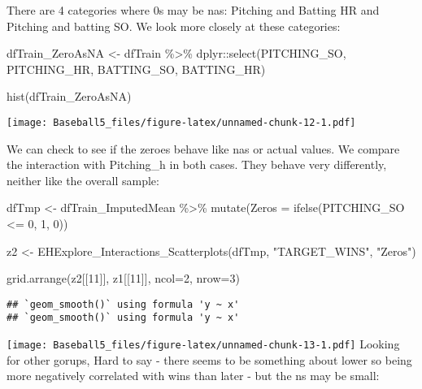 \documentclass[
]{article}
\newenvironment{Shaded}{\begin{snugshade}}{\end{snugshade}}
\newcommand{\AttributeTok}[1]{\textcolor[rgb]{0.77,0.63,0.00}{#1}}
\newcommand{\DecValTok}[1]{\textcolor[rgb]{0.00,0.00,0.81}{#1}}
\newcommand{\FunctionTok}[1]{\textcolor[rgb]{0.00,0.00,0.00}{#1}}
\newcommand{\NormalTok}[1]{#1}
\newcommand{\OtherTok}[1]{\textcolor[rgb]{0.56,0.35,0.01}{#1}}
\newcommand{\SpecialCharTok}[1]{\textcolor[rgb]{0.00,0.00,0.00}{#1}}
\newcommand{\StringTok}[1]{\textcolor[rgb]{0.31,0.60,0.02}{#1}}
\begin{document}
There are 4 categories where 0s may be nas: Pitching and Batting HR and
Pitching and batting SO. We look more closely at these categories:

\begin{Shaded}
\begin{Highlighting}[]
\NormalTok{dfTrain\_ZeroAsNA }\OtherTok{\textless{}{-}}\NormalTok{ dfTrain }\SpecialCharTok{\%\textgreater{}\%}
\NormalTok{dplyr}\SpecialCharTok{::}\FunctionTok{select}\NormalTok{(PITCHING\_SO, PITCHING\_HR, BATTING\_SO, BATTING\_HR)}

\FunctionTok{hist}\NormalTok{(dfTrain\_ZeroAsNA)}
\end{Highlighting}
\end{Shaded}

\texttt{[image: Baseball5\_files/figure-latex/unnamed-chunk-12-1.pdf]}

We can check to see if the zeroes behave like nas or actual values. We
compare the interaction with Pitching\_h in both cases. They behave very
differently, neither like the overall sample:

\begin{Shaded}
\begin{Highlighting}[]
\NormalTok{dfTmp }\OtherTok{\textless{}{-}}\NormalTok{ dfTrain\_ImputedMean }\SpecialCharTok{\%\textgreater{}\%}
  \FunctionTok{mutate}\NormalTok{(}\AttributeTok{Zeros =} \FunctionTok{ifelse}\NormalTok{(PITCHING\_SO }\SpecialCharTok{\textless{}=} \DecValTok{0}\NormalTok{, }\DecValTok{1}\NormalTok{, }\DecValTok{0}\NormalTok{))}

\NormalTok{z2 }\OtherTok{\textless{}{-}} \FunctionTok{EHExplore\_Interactions\_Scatterplots}\NormalTok{(dfTmp, }\StringTok{"TARGET\_WINS"}\NormalTok{, }\StringTok{"Zeros"}\NormalTok{)}

\FunctionTok{grid.arrange}\NormalTok{(z2[[}\DecValTok{11}\NormalTok{]], z1[[}\DecValTok{11}\NormalTok{]],  }\AttributeTok{ncol=}\DecValTok{2}\NormalTok{, }\AttributeTok{nrow=}\DecValTok{3}\NormalTok{)}
\end{Highlighting}
\end{Shaded}

\begin{verbatim}
## `geom_smooth()` using formula 'y ~ x'
## `geom_smooth()` using formula 'y ~ x'
\end{verbatim}

\texttt{[image: Baseball5\_files/figure-latex/unnamed-chunk-13-1.pdf]}
Looking for other gorups, Hard to say - there seems to be something
about lower so being more negatively correlated with wins than later -
but the ns may be small:
\end{document}
